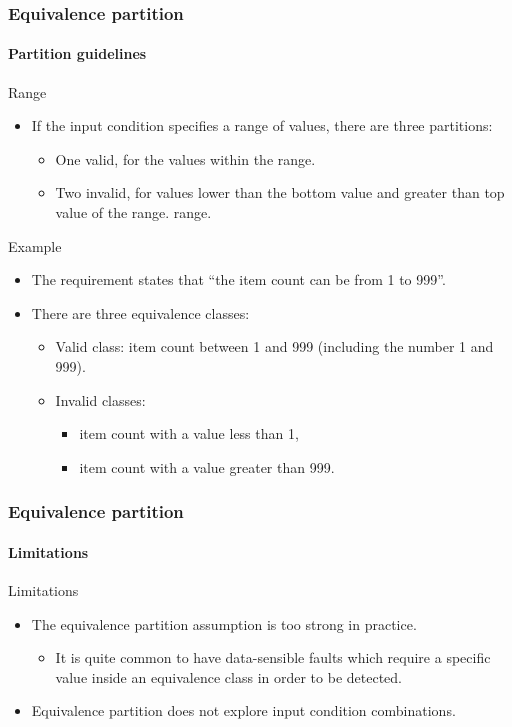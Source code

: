 \begin{frame}
\frametitle{Equivalence partition}
\framesubtitle{Partition guidelines}

\begin{block:fact}{Range}
\begin{itemize}
	\item If the input condition specifies a range of values, there are three
	partitions:
	\begin{itemize}
		\item One valid, for the values within the range.

		\item Two invalid, for values lower than the bottom value and greater
		than top value of the range.
		range.
	\end{itemize}
\end{itemize}
\end{block:fact}


\begin{block}{Example}
\begin{itemize}
	\item The requirement states that ``the item count can be from 1 to 999''.

	\item There are three equivalence classes:
	\begin{itemize}
		\item Valid class: item count between 1 and 999 (including the number
		1 and 999).
		\item Invalid classes:
		\begin{itemize}
			\item item count with a value less than 1,
			\item item count with a value greater than 999.
		\end{itemize}
	\end{itemize}
\end{itemize}
\end{block}
\end{frame}



\begin{frame}
\frametitle{Equivalence partition}
\framesubtitle{Limitations}

\begin{block:fact}{Limitations}
\begin{itemize}
	\item The equivalence partition assumption is too strong in practice.
	\begin{itemize}
		\item It is quite common to have data-sensible faults which require a
		specific value inside an equivalence class in order to be detected.
	\end{itemize}

	\item Equivalence partition does not explore input condition combinations.
\end{itemize}
\end{block:fact}
\end{frame}